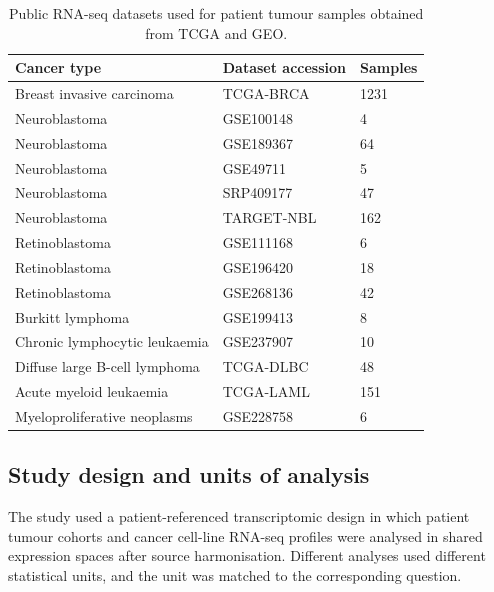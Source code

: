\begin{table}[H]
\centering
\caption{Public RNA-seq datasets used for patient tumour samples obtained from TCGA and GEO.}
\label{tab:patient_datasets}
\begin{tabular}{lll}
\toprule
Cancer type & Dataset accession & Samples \\
\midrule

Breast invasive carcinoma & TCGA-BRCA & 1231 \\

Neuroblastoma & GSE100148 & 4 \\
Neuroblastoma & GSE189367 & 64 \\
Neuroblastoma & GSE49711 & 5 \\
Neuroblastoma & SRP409177 & 47 \\
Neuroblastoma & TARGET-NBL & 162 \\

Retinoblastoma & GSE111168 & 6 \\
Retinoblastoma & GSE196420 & 18 \\
Retinoblastoma & GSE268136 & 42 \\

Burkitt lymphoma & GSE199413 & 8 \\
Chronic lymphocytic leukaemia & GSE237907 & 10 \\
Diffuse large B-cell lymphoma & TCGA-DLBC & 48 \\
Acute myeloid leukaemia & TCGA-LAML & 151 \\
Myeloproliferative neoplasms & GSE228758 & 6 \\

\bottomrule
\end{tabular}
\end{table}


\subsection{Study design and units of analysis}

The study used a patient-referenced transcriptomic design in which patient tumour cohorts and cancer cell-line RNA-seq profiles were analysed in shared expression spaces after source harmonisation. Different analyses used different statistical units, and the unit was matched to the corresponding question.

